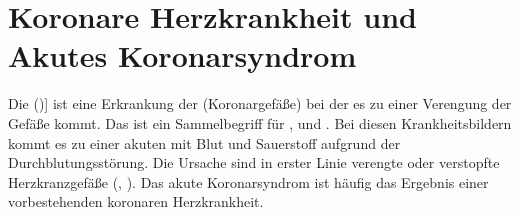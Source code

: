 \clearpage %
\section{Koronare Herzkrankheit und Akutes Koronarsyndrom}
\label{topic:khk}
\label{topic:aks}
\label{topic:akutes-koronarsyndrom}

{Die  ()] ist eine
Erkrankung der  (Koronargefäße) bei der
es zu einer Verengung der Gefäße kommt. Das  ist ein
Sammelbegriff für ,  und
. Bei diesen Krankheitsbildern
kommt es zu einer akuten  mit Blut und Sauerstoff aufgrund der
Durchblutungsstörung. Die Ursache sind in erster Linie
verengte oder verstopfte Herzkranzgefäße
(,
). Das akute Koronarsyndrom
ist häufig das Ergebnis einer vorbestehenden koronaren Herzkrankheit.} {} {} {}
{}



